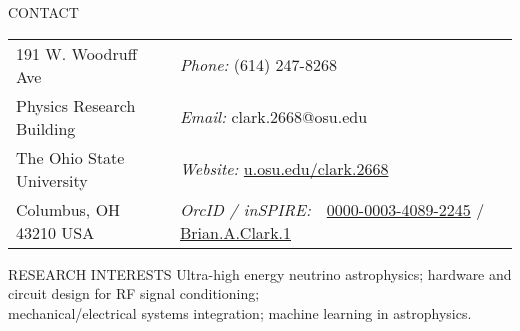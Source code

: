 \documentclass{resume} %
\begin{document}

\vspace{-.75cm}
\begin{rSection}{CONTACT}
\begin{tabular}{@{}p{2in}p{4in}}
191 W. Woodruff Ave             & {\it Phone:}  (614) 247-8268 \\            
Physics Research Building   & {\it Email:}  clark.2668@osu.edu 
 \\         
The Ohio State University & {\it Website:} \url{u.osu.edu/clark.2668} \\       
Columbus, OH  43210 USA  & {\it OrcID / inSPIRE:} \,\,      \href{https://orcid.org/0000-0003-4089-2245}{0000-0003-4089-2245}  / \href{https://inspirehep.net/author/profile/Brian.A.Clark.1}{Brian.A.Clark.1}\\     
\end{tabular}
\end{rSection}


\begin{rSection}{RESEARCH INTERESTS}
Ultra-high energy neutrino astrophysics; hardware and circuit design for RF signal conditioning; \\ mechanical/electrical systems integration; machine learning in astrophysics.
\end{rSection}

\end{document}

